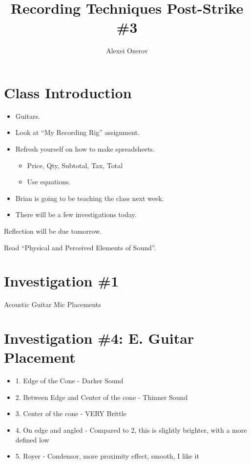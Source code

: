 \documentclass{article}
\title{Recording Techniques Post-Strike \#3}
\author{Alexei Ozerov}
\date{}
\begin{document}
\maketitle

\section{Class Introduction}

\begin{itemize}
\item Guitars.
\item Look at ``My Recording Rig'' assignment.
\item Refresh yourself on how to make spreadsheets.
	\begin{itemize}
	\item Price, Qty, Subtotal, Tax, Total
	\item Use equations.
	\end{itemize}
\item Brian is going to be teaching the class next week.
\item There will be a few investigations today.
\end{itemize}

\medskip

Reflection will be due tomorrow.

\medskip

Read ``Physical and Perceived Elements of Sound''.

\medskip

\section{Investigation \#1}

Acoustic Guitar Mic Placements

\section{Investigation \#4: E. Guitar Placement}

\begin{itemize}

\item 1. Edge of the Cone - Darker Sound 

\item 2. Between Edge and Center of the cone - Thinner Sound 

\item 3. Center of the cone - VERY Brittle

\item 4. On edge and angled - Compared to 2, this is slightly brighter, with a more defined low 

\item 5. Royer - Condensor, more proximity effect, smooth, I like it

\end{itemize}
\end{document}
